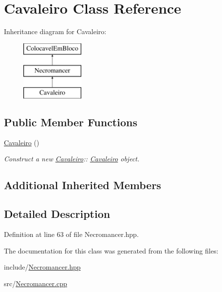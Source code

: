 \hypertarget{class_cavaleiro}{}\section{Cavaleiro Class Reference}
\label{class_cavaleiro}
Inheritance diagram for Cavaleiro\+:\begin{figure}[H]
\begin{center}
\leavevmode
\includegraphics[height=3.000000cm]{class_cavaleiro}
\end{center}
\end{figure}
\subsection*{Public Member Functions}
\begin{DoxyCompactItemize}
\item 
\mbox{\label{class_cavaleiro_a3941e46c628ff9fb3c27e73936795df7}} 
\mbox{\hyperlink{class_cavaleiro_a3941e46c628ff9fb3c27e73936795df7}{Cavaleiro}} ()
\begin{DoxyCompactList}\small\item\em Construct a new \mbox{\hyperlink{class_cavaleiro}{Cavaleiro}}\+:\+: \mbox{\hyperlink{class_cavaleiro}{Cavaleiro}} object. \end{DoxyCompactList}\end{DoxyCompactItemize}
\subsection*{Additional Inherited Members}


\subsection{Detailed Description}


Definition at line 63 of file Necromancer.\+hpp.



The documentation for this class was generated from the following files\+:\begin{DoxyCompactItemize}
\item 
include/\mbox{\hyperlink{_necromancer_8hpp}{Necromancer.\+hpp}}\item 
src/\mbox{\hyperlink{_necromancer_8cpp}{Necromancer.\+cpp}}\end{DoxyCompactItemize}
